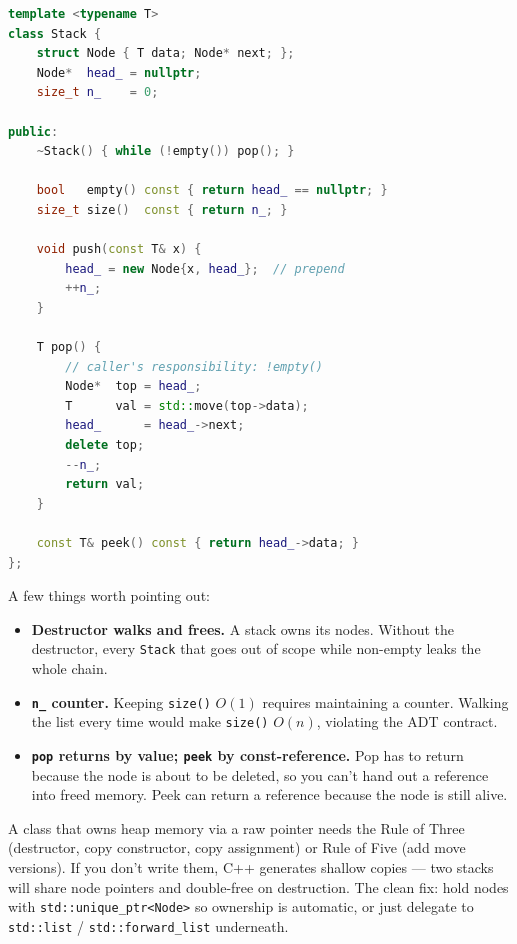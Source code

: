 \documentclass[11pt]{article}
\begin{document}
\begin{examplebox}
\begin{lstlisting}[language=C++,basicstyle=\ttfamily\small,frame=single]
template <typename T>
class Stack {
    struct Node { T data; Node* next; };
    Node*  head_ = nullptr;
    size_t n_    = 0;

public:
    ~Stack() { while (!empty()) pop(); }

    bool   empty() const { return head_ == nullptr; }
    size_t size()  const { return n_; }

    void push(const T& x) {
        head_ = new Node{x, head_};  // prepend
        ++n_;
    }

    T pop() {
        // caller's responsibility: !empty()
        Node*  top = head_;
        T      val = std::move(top->data);
        head_      = head_->next;
        delete top;
        --n_;
        return val;
    }

    const T& peek() const { return head_->data; }
};
\end{lstlisting}
\end{examplebox}

A few things worth pointing out:

\begin{itemize}[leftmargin=*]
    \item \textbf{Destructor walks and frees.} A stack owns its
          nodes. Without the destructor, every \texttt{Stack}
          that goes out of scope while non-empty leaks the whole
          chain.
    \item \textbf{\texttt{n\_} counter.} Keeping \texttt{size()}
          $O(1)$ requires maintaining a counter. Walking the list
          every time would make \texttt{size()} $O(n)$, violating
          the ADT contract.
    \item \textbf{\texttt{pop} returns by value; \texttt{peek} by
          const-reference.} Pop has to return because the node is
          about to be deleted, so you can't hand out a reference
          into freed memory. Peek can return a reference because
          the node is still alive.
\end{itemize}

\begin{warnbox}
A class that owns heap memory via a raw pointer needs the Rule of
Three (destructor, copy constructor, copy assignment) or Rule of
Five (add move versions). If you don't write them, C++ generates
shallow copies --- two stacks will share node pointers and
double-free on destruction. The clean fix: hold nodes with
\texttt{std::unique\_ptr<Node>} so ownership is automatic, or
just delegate to \texttt{std::list} / \texttt{std::forward\_list}
underneath.
\end{warnbox}
\end{document}
